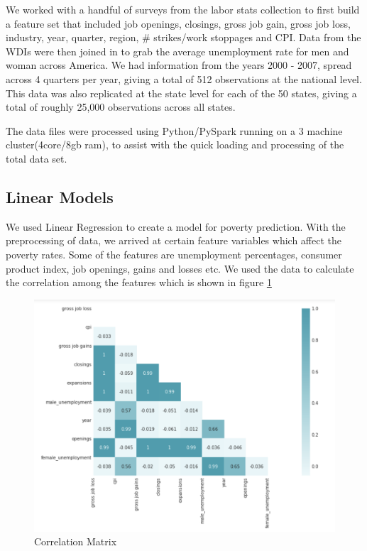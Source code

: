 \documentclass[11pt,letterpaper]{article}
\begin{document}
We worked with a handful of surveys from the labor stats collection to first build a feature set that included job openings, closings, gross job gain, gross job loss, industry, year, quarter, region, \# strikes/work stoppages and CPI. Data from the WDIs were then joined in to grab the average unemployment rate for men and woman across America. We had information from the years 2000 - 2007, spread across 4 quarters per year, giving a total of 512 observations at the national level. This data was also replicated at the state level for each of the 50 states, giving a total of roughly 25,000 observations across all states.

The data files were processed using Python/PySpark running on a 3 machine cluster(4core/8gb ram), to assist with the quick loading and processing of the total data set. 

\subsection{Linear Models}
\label{ssec:lm}

We used Linear Regression to create a model for poverty prediction. With the preprocessing of data, we arrived at certain feature variables which affect the poverty rates. Some of the features are unemployment percentages, consumer product index, job openings, gains and losses etc. We used the data to calculate the correlation among the features which is shown in figure \ref{fig:Correlation Matrix}

\begin{figure}
\centering
\includegraphics[width=\linewidth]{"./pictures/Correlation_Matrix"}
\caption{Correlation Matrix}
\label{fig:Correlation Matrix}
\end{figure}
\end{document}
